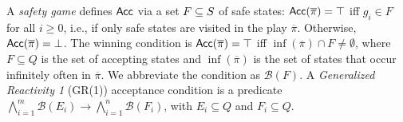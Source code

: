 A \emph{safety game} defines $\mathsf{Acc}$ via a set $F\subseteq S$ of
safe states: $\mathsf{Acc}(\overline{\pi})=\top$ iff $g_i \in F$ for all $i \geq 0$, i.e., if only safe states are visited in the play $\overline{\pi}$. Otherwise, $\mathsf{Acc}(\overline{\pi})=\bot$.
%
The \emph{\buchi} winning condition is $\mathsf{Acc}(\overline{\pi})=\top$ iff $\inf(\overline{\pi})
\cap F \neq \emptyset$, where $F \subseteq Q$ is
the set of accepting states and $\inf(\overline{\pi})$ is the set of states that occur infinitely often in $\overline{\pi}$.
We abbreviate the \buchi condition as $\mathcal{B}(F)$.
A \emph{Generalized Reactivity 1} (GR(1))
acceptance condition is a predicate $\bigwedge_{i=1}^{m} \mathcal{B}(E_{i}) \rightarrow \bigwedge_{i=1}^{n} \mathcal{B}(F_{i})$, with
$E_i \subseteq Q$ and $F_i \subseteq Q$.
%
\iffalse MEAN-PAYOFF
A \emph{mean-payoff game} is a game where $\Val$ is defined via an edge labeling function $r :
\delta \rightarrow \{-W,\dots, W\}$, which assigns values between $-W$ and $W$ to edges. For a play $\pi =
e_0 e_1 e_2 \dots \in \delta^\omega, \Val(\overline{\pi}) = \lim \sup_{n\rightarrow\infty} \frac{1}{n+1} \sum_{i=0}^{n} r(e_i)$.
\fi




